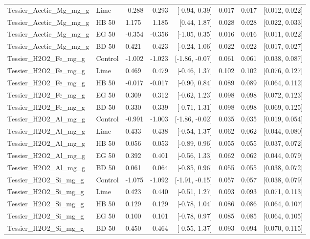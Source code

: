 \documentclass[preprint,12pt]{elsarticle}
\begin{document}
\begin{landscape}
\begin{longtable}{lllrrrrr}
Tessier\_Acetic\_Mg\_mg\_g & Lime & -0.288 & -0.293 & [-0.94, 0.39] & 0.017 & 0.017 & [0.012, 0.022] \\
Tessier\_Acetic\_Mg\_mg\_g & HB 50 & 1.175 & 1.185 & [0.44, 1.87] & 0.028 & 0.028 & [0.022, 0.033] \\
Tessier\_Acetic\_Mg\_mg\_g & EG 50 & -0.354 & -0.356 & [-1.05, 0.35] & 0.016 & 0.016 & [0.011, 0.022] \\
Tessier\_Acetic\_Mg\_mg\_g & BD 50 & 0.421 & 0.423 & [-0.24, 1.06] & 0.022 & 0.022 & [0.017, 0.027] \\
Tessier\_H2O2\_Fe\_mg\_g & Control & -1.002 & -1.023 & [-1.86, -0.07] & 0.061 & 0.061 & [0.038, 0.087] \\
Tessier\_H2O2\_Fe\_mg\_g & Lime & 0.469 & 0.479 & [-0.46, 1.37] & 0.102 & 0.102 & [0.076, 0.127] \\
Tessier\_H2O2\_Fe\_mg\_g & HB 50 & -0.017 & -0.017 & [-0.90, 0.84] & 0.089 & 0.089 & [0.064, 0.112] \\
Tessier\_H2O2\_Fe\_mg\_g & EG 50 & 0.309 & 0.312 & [-0.62, 1.23] & 0.098 & 0.098 & [0.072, 0.123] \\
Tessier\_H2O2\_Fe\_mg\_g & BD 50 & 0.330 & 0.339 & [-0.71, 1.31] & 0.098 & 0.098 & [0.069, 0.125] \\
Tessier\_H2O2\_Al\_mg\_g & Control & -0.991 & -1.003 & [-1.86, -0.02] & 0.035 & 0.035 & [0.019, 0.054] \\
Tessier\_H2O2\_Al\_mg\_g & Lime & 0.433 & 0.438 & [-0.54, 1.37] & 0.062 & 0.062 & [0.044, 0.080] \\
Tessier\_H2O2\_Al\_mg\_g & HB 50 & 0.056 & 0.053 & [-0.89, 0.96] & 0.055 & 0.055 & [0.037, 0.072] \\
Tessier\_H2O2\_Al\_mg\_g & EG 50 & 0.392 & 0.401 & [-0.56, 1.33] & 0.062 & 0.062 & [0.044, 0.079] \\
Tessier\_H2O2\_Al\_mg\_g & BD 50 & 0.061 & 0.064 & [-0.85, 0.96] & 0.055 & 0.055 & [0.038, 0.072] \\
Tessier\_H2O2\_Si\_mg\_g & Control & -1.075 & -1.092 & [-1.91, -0.15] & 0.057 & 0.057 & [0.038, 0.079] \\
Tessier\_H2O2\_Si\_mg\_g & Lime & 0.423 & 0.440 & [-0.51, 1.27] & 0.093 & 0.093 & [0.071, 0.113] \\
Tessier\_H2O2\_Si\_mg\_g & HB 50 & 0.129 & 0.129 & [-0.78, 1.04] & 0.086 & 0.086 & [0.064, 0.107] \\
Tessier\_H2O2\_Si\_mg\_g & EG 50 & 0.100 & 0.101 & [-0.78, 0.97] & 0.085 & 0.085 & [0.064, 0.105] \\
Tessier\_H2O2\_Si\_mg\_g & BD 50 & 0.450 & 0.464 & [-0.55, 1.37] & 0.093 & 0.094 & [0.070, 0.115] \\

\end{longtable}
\end{landscape}
\end{document}
